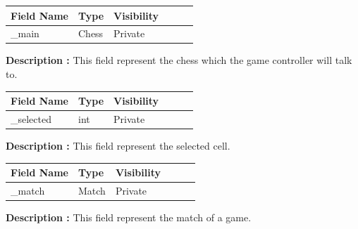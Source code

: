 \documentclass[12pt]{article}
\begin{document}
\begin{table}[H]
    \begin{tabular}{llllll}
    \hline
    \multicolumn{1}{|l|}{\cellcolor[HTML]{EFEFEF}\textbf{Field Name}} & \multicolumn{1}{l|}{\cellcolor[HTML]{EFEFEF}\textbf{Type}} & \multicolumn{1}{l|}{\cellcolor[HTML]{EFEFEF}\textbf{Visibility}} \\ \hline
    \multicolumn{1}{|l|}{\_main}                                      & \multicolumn{1}{l|}{Chess}                                 & \multicolumn{1}{l|}{Private}                                     \\ \hline
    \end{tabular}
\end{table}

\textbf{Description :} This field represent the chess which the game controller will talk to.

\begin{table}[H]
    \begin{tabular}{llllll}
    \hline
    \multicolumn{1}{|l|}{\cellcolor[HTML]{EFEFEF}\textbf{Field Name}} & \multicolumn{1}{l|}{\cellcolor[HTML]{EFEFEF}\textbf{Type}} & \multicolumn{1}{l|}{\cellcolor[HTML]{EFEFEF}\textbf{Visibility}} \\ \hline
    \multicolumn{1}{|l|}{\_selected}                                      & \multicolumn{1}{l|}{int}                                 & \multicolumn{1}{l|}{Private}                                     \\ \hline
    \end{tabular}
\end{table}

\textbf{Description :} This field represent the selected cell.

\begin{table}[H]
    \begin{tabular}{llllll}
    \hline
    \multicolumn{1}{|l|}{\cellcolor[HTML]{EFEFEF}\textbf{Field Name}} & \multicolumn{1}{l|}{\cellcolor[HTML]{EFEFEF}\textbf{Type}} & \multicolumn{1}{l|}{\cellcolor[HTML]{EFEFEF}\textbf{Visibility}} \\ \hline
    \multicolumn{1}{|l|}{\_match}                                      & \multicolumn{1}{l|}{Match}                                 & \multicolumn{1}{l|}{Private}                                     \\ \hline
    \end{tabular}
\end{table}

\textbf{Description :} This field represent the match of a game.
\end{document}

